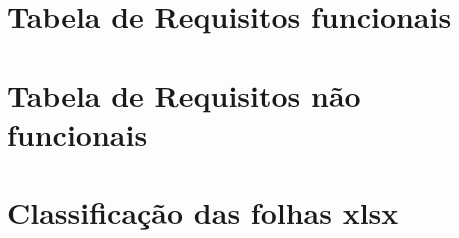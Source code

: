\chapter{Tabela de Requisitos funcionais}
\label{ch:outroDetalheAdicional}


\chapter{Tabela de Requisitos não funcionais}
\label{ch:outroDetalheAdicional}


\chapter{Classificação das folhas \gls{xlsx}}
\label{ch:outroDetalheAdicional}









